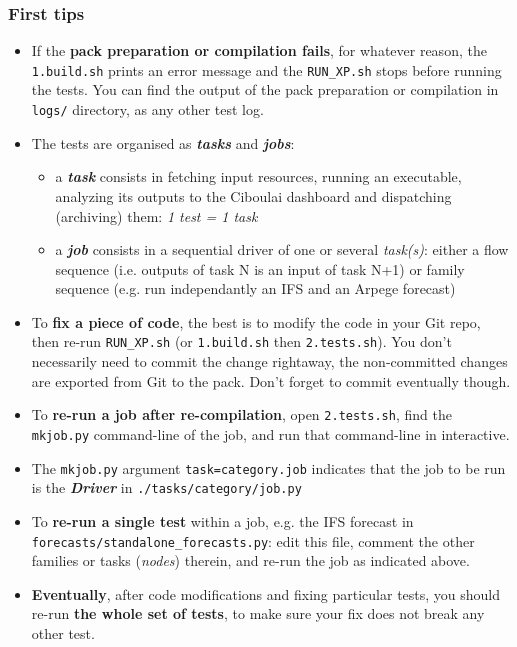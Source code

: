 \documentclass[a4paper,10pt,twoside]{article}
\begin{document}
\subsubsection{First tips}
\begin{itemize}
 \item If the \textbf{pack preparation or compilation fails}, for whatever reason, the \texttt{1.build.sh} prints an error message and the \texttt{RUN\_XP.sh} stops before running the tests. You can find the output of the pack preparation or compilation in \texttt{logs/} directory, as any other test log.
 \item The tests are organised as \textit{\textbf{tasks}} and \textit{\textbf{jobs}}:
  \begin{itemize}
   \item a \textit{\textbf{task}} consists in fetching input resources, running an executable, analyzing its outputs to the Ciboulai dashboard and dispatching (archiving) them: \textit{1 test = 1 task}
   \item a \textit{\textbf{job}} consists in a sequential driver of one or several \textit{task(s)}: either a flow sequence (i.e. outputs of task N is an input of task N+1) or family sequence (e.g. run independantly an IFS and an Arpege forecast)
  \end{itemize}
 \item To \textbf{fix a piece of code}, the best is to modify the code in your Git repo, then re-run \texttt{RUN\_XP.sh} (or \texttt{1.build.sh} then \texttt{2.tests.sh}). You don't necessarily need to commit the change rightaway, the non-committed changes are exported from Git to the pack. Don't forget to commit eventually though.
 \item To \textbf{re-run a job after re-compilation}, open \texttt{2.tests.sh}, find the \texttt{mkjob.py} command-line of the job, and run that command-line in interactive.
 \item The \texttt{mkjob.py} argument \texttt{task=category.job} indicates that the job to be run is the \textit{\textbf{Driver}} in \texttt{./tasks/category/job.py}
 \item To \textbf{re-run a single test} within a job, e.g. the IFS forecast in \texttt{forecasts/standalone\_forecasts.py}: edit this file, comment the other families or tasks (\textit{nodes}) therein, and re-run the job as indicated above.
 \item \textbf{Eventually}, after code modifications and fixing particular tests, you should re-run \textbf{the whole set of tests}, to make sure your fix does not break any other test.
\end{itemize}
\end{document}
